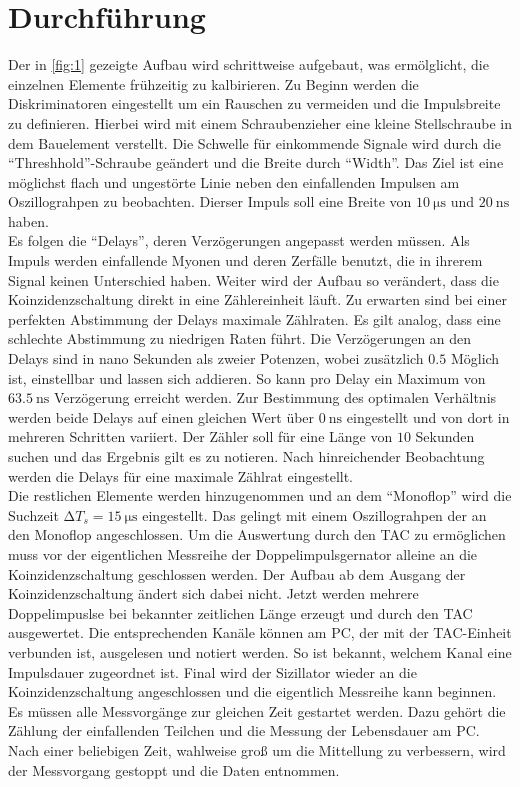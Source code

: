 \section{Durchführung}
Der in \ref{fig:1} gezeigte Aufbau wird schrittweise aufgebaut, was ermölglicht, die einzelnen Elemente
frühzeitig zu kalbirieren. Zu Beginn werden die Diskriminatoren eingestellt um ein Rauschen zu vermeiden und die Impulsbreite zu definieren.
Hierbei wird mit einem Schraubenzieher eine kleine Stellschraube in dem Bauelement verstellt. Die Schwelle für einkommende Signale
wird durch die \enquote{Threshhold}-Schraube geändert und die Breite durch \enquote{Width}. Das Ziel ist eine möglichst flach und ungestörte Linie 
neben den einfallenden Impulsen am Oszillograhpen zu beobachten. Dierser Impuls soll eine Breite von $\SI{10}{\micro\second}$ und $\SI{20}{\nano\second}$ haben.
\\
\newline
Es folgen die \enquote{Delays}, deren Verzögerungen angepasst werden müssen. Als Impuls werden einfallende Myonen und deren Zerfälle 
benutzt, die in ihrerem Signal keinen Unterschied haben. Weiter wird der Aufbau so verändert, dass die Koinzidenzschaltung direkt in eine Zählereinheit läuft. 
Zu erwarten sind bei einer perfekten Abstimmung der Delays maximale Zählraten. Es gilt analog, dass eine schlechte Abstimmung zu niedrigen Raten führt. 
Die Verzögerungen an den Delays sind in nano Sekunden als zweier Potenzen, wobei zusätzlich $0.5$ Möglich ist, einstellbar und lassen sich addieren. So kann pro Delay
ein Maximum von $\SI{63.5}{\nano\second}$ Verzögerung erreicht werden. Zur Bestimmung des optimalen Verhältnis werden beide Delays auf einen gleichen Wert über $\SI{0}{\nano\second}$ eingestellt und von dort 
in mehreren Schritten variiert. Der Zähler soll für eine Länge von $10$ Sekunden suchen und das Ergebnis gilt es zu notieren.
Nach hinreichender Beobachtung werden die Delays für eine maximale Zählrat eingestellt.
\\
\newline
Die restlichen Elemente werden hinzugenommen und an dem \enquote{Monoflop} wird die Suchzeit $\increment T_s = \SI{15}{\micro\second}$ eingestellt. 
Das gelingt mit einem Oszillograhpen der an den Monoflop angeschlossen.
Um die Auswertung durch den TAC zu ermöglichen muss vor der eigentlichen Messreihe der Doppelimpulsgernator alleine an die Koinzidenzschaltung
geschlossen werden. Der Aufbau ab dem Ausgang der Koinzidenzschaltung ändert sich dabei nicht. 
Jetzt werden mehrere Doppelimpuslse bei bekannter zeitlichen Länge erzeugt und durch den TAC ausgewertet. Die entsprechenden Kanäle können am PC, der mit der TAC-Einheit verbunden ist, 
ausgelesen und notiert werden. So ist bekannt, welchem Kanal eine Impulsdauer zugeordnet ist. 
Final wird der Sizillator wieder an die Koinzidenzschaltung angeschlossen und die eigentlich Messreihe kann beginnen. 
Es müssen alle Messvorgänge zur gleichen Zeit gestartet werden. Dazu gehört die Zählung der einfallenden Teilchen und die Messung der Lebensdauer am PC.
Nach einer beliebigen Zeit, wahlweise groß um die Mittellung zu verbessern, wird der Messvorgang gestoppt und die Daten entnommen.